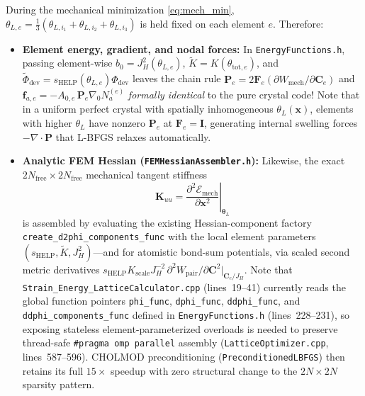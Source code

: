 \documentclass[11pt,a4paper]{article}
\newcommand{\code}[1]{\texttt{#1}}
\begin{document}
During the mechanical minimization \eqref{eq:mech_min}, $\theta_{L,e} = \frac{1}{3}(\theta_{L,i_1} + \theta_{L,i_2} + \theta_{L,i_3})$ is held fixed on each element $e$. Therefore:
\begin{itemize}[nosep]
  \item \textbf{Element energy, gradient, and nodal forces:} In \code{EnergyFunctions.h}, passing element-wise $b_0 = J_H^2(\theta_{L,e})$, $\tilde{K} = K(\theta_{\text{tot},e})$, and $\tilde{\Phi}_{\text{dev}} = s_{\text{HELP}}(\theta_{L,e})\Phi_{\text{dev}}$ leaves the chain rule $\mathbf{P}_e = 2\mathbf{F}_e (\partial W_{\text{mech}} / \partial \mathbf{C}_e)$ and $\mathbf{f}_{a,e} = -A_{0,e}\,\mathbf{P}_e \nabla_0 N_a^{(e)}$ \emph{formally identical} to the pure crystal code! Note that in a uniform perfect crystal with spatially inhomogeneous $\theta_L(\mathbf{x})$, elements with higher $\theta_L$ have nonzero $\mathbf{P}_e$ at $\mathbf{F}_e = \mathbf{I}$, generating internal swelling forces $-\nabla \cdot \mathbf{P}$ that L-BFGS relaxes automatically.
  \item \textbf{Analytic FEM Hessian (\code{FEMHessianAssembler.h}):} Likewise, the exact $2N_{\text{free}} \times 2N_{\text{free}}$ mechanical tangent stiffness
  \begin{equation}
    \mathbf{K}_{uu} = \left.\frac{\partial^2 \mathcal{E}_{\text{mech}}}{\partial \mathbf{x}^2}\right|_{\boldsymbol{\theta}_L}
    \label{eq:kuu_undrained}
  \end{equation}
  is assembled by evaluating the existing Hessian-component factory \code{create\_\allowbreak d2phi\_\allowbreak components\_\allowbreak func} with the local element parameters $(s_{\text{HELP}}, \tilde{K}, J_H^2)$---and for atomistic bond-sum potentials, via scaled second metric derivatives $s_{\text{HELP}} K_{\text{scale}} J_H^{-2}\,\partial^2 W_{\text{pair}}/\partial\mathbf{C}^2|_{\mathbf{C}_e/J_H}$. Note that \code{Strain\_\allowbreak Energy\_\allowbreak LatticeCalculator.cpp} (lines~19--41) currently reads the global function pointers \code{phi\_func}, \code{dphi\_func}, \code{ddphi\_func}, and \code{ddphi\_\allowbreak components\_\allowbreak func} defined in \code{EnergyFunctions.h} (lines~228--231), so exposing stateless element-parameterized overloads is needed to preserve thread-safe \code{\#pragma omp parallel} assembly (\code{LatticeOptimizer.cpp}, lines~587--596). CHOLMOD preconditioning (\code{PreconditionedLBFGS}) then retains its full $15\times$ speedup with zero structural change to the $2N \times 2N$ sparsity pattern.
\end{itemize}
\end{document}
